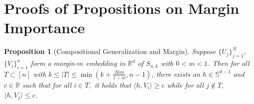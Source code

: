 \documentclass[preprint]{article}
\newtheorem{proposition}{Proposition}[]
\newcommand{\ksparsen}{S_{n,k}}
\begin{document}
\section{Proofs of Propositions on Margin Importance}
\label{sec:margin-importance}

\begin{proposition}[Compositional Generalization and Margin]
\label{prop:margincompositional}
Suppose $\{U_j\}_{j = 1}^N$, $\{V_i\}_{i = 1}^n$ form a margin-$m$ embedding in $\mathbb{R}^d$ of $\ksparsen$ with $0 < m < 1$. Then for all $T \subset [n]$ with $k \leq |T| \leq \min(k + \frac{2km}{1 -m} ,n - 1)$, there exists an $h \in \mathbb{S}^{d-1}$ and $c \in \mathbb{R}$ such that for all $i\in T,$
it holds that 
$\langle h, V_i\rangle \geq c$ while for all $j \not \in T,$
$\langle h, V_j\rangle \leq c.$
\end{proposition}
\end{document}
